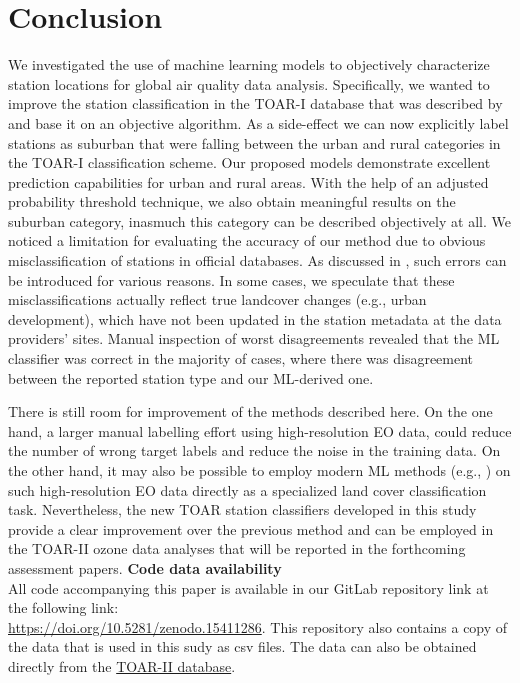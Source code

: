 \documentclass[gmd, manuscript]{copernicus}
\begin{document}
\section{Conclusion} %
We investigated the use of machine learning models to objectively characterize station locations for global air quality data analysis. Specifically, we wanted to improve the station classification in the TOAR-I database that was described by \cite{Schultz2017} and base it on an objective algorithm. As a side-effect we can now explicitly label stations as suburban that were falling between the urban and rural categories in the TOAR-I classification scheme. Our proposed models demonstrate excellent prediction capabilities for urban and rural areas. With the help of an adjusted probability threshold technique, we also obtain meaningful results on the suburban category, inasmuch this category can be described objectively at all. We noticed a limitation for evaluating the accuracy of our method due to obvious misclassification of stations in official databases. As discussed in \citep{Schultz2017}, such errors can be introduced for various reasons. In some cases, we speculate that these misclassifications actually reflect true landcover changes (e.g., urban development), which have not been updated in the station metadata at the data providers' sites. Manual inspection of worst disagreements revealed that the ML classifier was correct in the majority of cases, where there was disagreement between the reported station type and our ML-derived one.

There is still room for improvement of the methods described here. On the one hand, a larger manual labelling effort using high-resolution EO data, could reduce the number of wrong target labels and reduce the noise in the training data. On the other hand, it may also be possible to employ modern ML methods (e.g., \citep{szwarcman2024prithvi}) on such high-resolution EO data directly as a specialized land cover classification task. Nevertheless, the new TOAR station classifiers developed in this study provide a clear improvement over the previous method and can be employed in the TOAR-II ozone data analyses that will be reported in the forthcoming assessment papers.
\newpage
\textbf{Code data availability }\\All code accompanying this paper is available in our GitLab repository  link\citep{Mache2025TOARClassifier} at the following link: \\
\href{https://doi.org/10.5281/zenodo.15411286}{https://doi.org/10.5281/zenodo.15411286}. 
This repository also contains a copy of the data that is used in this sudy as csv files. The data can also be obtained directly from the  \href{https://toar-data.fz-juelich.de/api/v2}{TOAR-II database}. %
\end{document}
